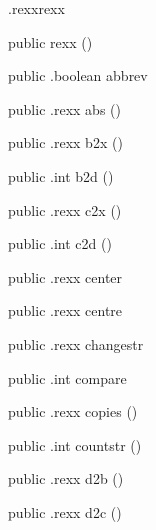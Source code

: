 \begin{CrexxClass}{.rexx}{rexx}

  \begin{Hierarchy}
  \end{Hierarchy}

  \begin{Members}

    \Factory
      {public}
      {rexx}
      {()}

    \Method
      {public}
      {.boolean}
      {abbrev}
      {}

    \Method
      {public}
      {.rexx}
      {abs}
      {()}

    \Method
      {public}
      {.rexx}
      {b2x}
      {()}

    \Method
      {public}
      {.int}
      {b2d}
      {()}

    \Method
      {public}
      {.rexx}
      {c2x}
      {()}

    \Method
      {public}
      {.int}
      {c2d}
      {()}

    \Method
      {public}
      {.rexx}
      {center}
      {}

    \Method
      {public}
      {.rexx}
      {centre}
      {}

    \Method
      {public}
      {.rexx}
      {changestr}
      {}

    \Method
      {public}
      {.int}
      {compare}
      {}

    \Method
      {public}
      {.rexx}
      {copies}
      {()}

    \Method
      {public}
      {.int}
      {countstr}
      {()}

    \Method
      {public}
      {.rexx}
      {d2b}
      {()}

    \Method
      {public}
      {.rexx}
      {d2c}
      {()}


\end{Members}
\end{CrexxClass}
